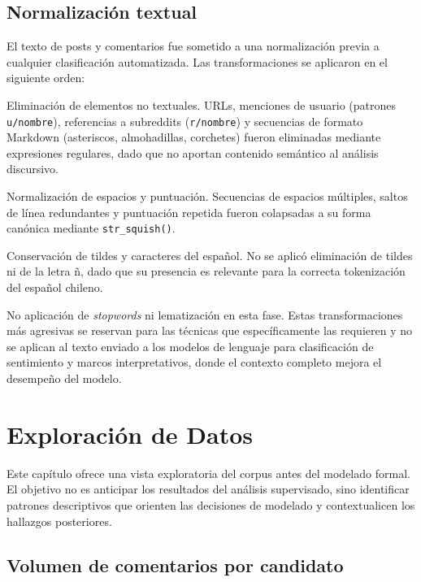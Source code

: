 \documentclass[
  letterpaper,
  numbers=noendperiod,
  fontsize=11pt,
  DIV=12,
  titlepage=false]{scrreprt}
\begin{document}
\section{Normalización textual}\label{normalizaciuxf3n-textual}

El texto de posts y comentarios fue sometido a una normalización previa
a cualquier clasificación automatizada. Las transformaciones se
aplicaron en el siguiente orden:

Eliminación de elementos no textuales. URLs, menciones de usuario
(patrones \texttt{u/nombre}), referencias a subreddits
(\texttt{r/nombre}) y secuencias de formato Markdown (asteriscos,
almohadillas, corchetes) fueron eliminadas mediante expresiones
regulares, dado que no aportan contenido semántico al análisis
discursivo.

Normalización de espacios y puntuación. Secuencias de espacios
múltiples, saltos de línea redundantes y puntuación repetida fueron
colapsadas a su forma canónica mediante \texttt{str\_squish()}.

Conservación de tildes y caracteres del español. No se aplicó
eliminación de tildes ni de la letra ñ, dado que su presencia es
relevante para la correcta tokenización del español chileno.

No aplicación de \emph{stopwords} ni lematización en esta fase. Estas
transformaciones más agresivas se reservan para las técnicas que
específicamente las requieren y no se aplican al texto enviado a los
modelos de lenguaje para clasificación de sentimiento y marcos
interpretativos, donde el contexto completo mejora el desempeño del
modelo.


\chapter{Exploración de Datos}\label{exploraciuxf3n-de-datos}

Este capítulo ofrece una vista exploratoria del corpus antes del
modelado formal. El objetivo no es anticipar los resultados del análisis
supervisado, sino identificar patrones descriptivos que orienten las
decisiones de modelado y contextualicen los hallazgos posteriores.

\section{Volumen de comentarios por
candidato}\label{volumen-de-comentarios-por-candidato}
\end{document}
